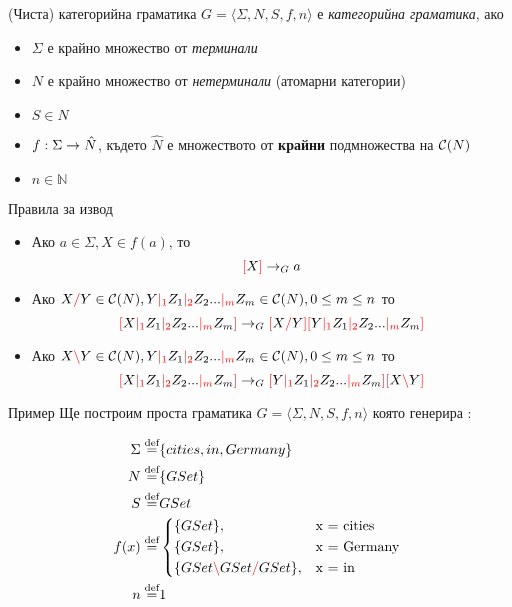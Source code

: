 \documentclass[9pt]{beamer}
\begin{document}
  \begin{frame}{(Чиста) категорийна граматика}
    $ G = \langle \Sigma, N, S, f, n \rangle $ е \emph{категорийна граматика}, ако
    \begin{itemize}
        \item $ \Sigma $ е крайно множество от \emph{терминали}
        \item $ N $ е крайно множество от \emph{нетерминали} (атомарни категории)
        \item $ S \in N $
        \item $ f : \Sigma \rightarrow \hat{N} $, където $\hat{N}$ е множеството от
            \textbf{крайни} подмножества на $\mathcal{C}( N )$
        \item $ n \in \mathbb{N} $
    \end{itemize}
  \end{frame}

  \begin{frame}{Правила за извод}
    \begin{itemize}
        \item Ако $ a \in \Sigma, X \in f(a) $, то \[ \textcolor{red}{[} X \textcolor{red}{]} \rightarrow_G a \]
        \item Ако $ X \textcolor{red}{/} Y \in \mathcal{C}( N ), Y \textcolor{red}{|_{1}} Z_1 \textcolor{red}{|_{2}} Z_2 ... \textcolor{red}{|_{m}} Z_m \in \mathcal{C}( N ), 0 \leq m \leq n $
            то \[ \textcolor{red}{[} X \textcolor{red}{|_{1}} Z_1 \textcolor{red}{|_{2}} Z_2 ... \textcolor{red}{|_{m}} Z_m \textcolor{red}{]} \rightarrow_G \textcolor{red}{[} X \textcolor{red}{/} Y \textcolor{red}{]} \textcolor{red}{[} Y \textcolor{red}{|_{1}} Z_1 \textcolor{red}{|_{2}} Z_2 ... \textcolor{red}{|_{m}} Z_m \textcolor{red}{]} \]
        \item Ако $ X \textcolor{red}{\backslash} Y \in \mathcal{C}( N ), Y \textcolor{red}{|_{1}} Z_1 \textcolor{red}{|_{2}} Z_2 ... \textcolor{red}{|_{m}} Z_m \in \mathcal{C}( N ), 0 \leq m \leq n $
            то \[ \textcolor{red}{[} X \textcolor{red}{|_{1}} Z_1 \textcolor{red}{|_{2}} Z_2 ... \textcolor{red}{|_{m}} Z_m \textcolor{red}{]} \rightarrow_G \textcolor{red}{[} Y \textcolor{red}{|_{1}} Z_1 \textcolor{red}{|_{2}} Z_2 ... \textcolor{red}{|_{m}} Z_m \textcolor{red}{]} \textcolor{red}{[} X \textcolor{red}{\backslash} Y \textcolor{red}{]} \]
    \end{itemize}
  \end{frame}

  \begin{frame}{Пример}
    Ще построим проста граматика $G = \langle \Sigma, N, S, f, n \rangle$
    която генерира :

    \begin{align*}
        \Sigma \defeq& \{ cities, in, Germany \} \\
        N \defeq& \{ GSet \} \\
        S \defeq& GSet \\
        f(x) \defeq&
            \begin{cases*}
                \{ GSet \},& x = cities \\
                \{ GSet \},& x = Germany \\
                \{ GSet \lc GSet \rc GSet \},& x = in \\
            \end{cases*} \\
        n \defeq& 1 \\
    \end{align*}
  \end{frame}
\end{document}
